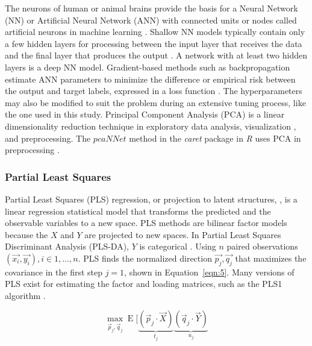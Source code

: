 \let\LaTeXcline\cline\documentclass[sn-mathphys-num]{sn-jnl}\let\cline\LaTeXcline
\begin{document}
The neurons of human or animal brains provide the basis for a Neural Network (NN) or Artificial Neural Network (ANN) with connected units or nodes called artificial neurons in machine learning \cite{brahme2014comprehensive}. Shallow NN models typically contain only a few hidden layers for processing between the input layer that receives the data and the final layer that produces the output \cite{olden2002illuminating}. A network with at least two hidden layers \cite{bishop2006pattern} is a deep NN model. Gradient-based methods such as backpropagation estimate ANN parameters \cite{vapnik2013nature} to minimize the difference or empirical risk between the output and target labels, expressed in a loss function \cite{goodfellow2016deep}. The hyperparameters may also be modified to suit the problem \cite{probst2019tunability} during an extensive tuning process, like the one used in this study. Principal Component Analysis (PCA) \cite{stewart2019introduction} is a linear dimensionality reduction technique in exploratory data analysis, visualization \cite{jolliffe2016principal}, and preprocessing. The $pcaNNet$ method in the \textit{caret} package in \textit{R} uses PCA in preprocessing \cite{Kuhn2007, kuhn2008building, kuhn2013applied}.

\subsubsection{Partial Least Squares}

Partial Least Squares (PLS) regression, or projection to latent structures, \cite{abdi2010partial}, is a linear regression statistical model that transforms the predicted and the observable variables to a new space. PLS methods are bilinear factor models because the $X$ and $Y$ are projected to new spaces. In Partial Least Squares Discriminant Analysis (PLS-DA), $Y$ is categorical \cite{saebo2008lpls}. Using $n$ paired observations $\left(\vec{x_{i}}, \vec{y_{i}}\right), i \in 1, \dots, n$. PLS finds the normalized direction $\vec{p_{j}}, \vec{q_{j}}$ that maximizes the covariance in the first step $j = 1$, shown in Equation~\ref{eqn:5}. Many versions of PLS exist for estimating the factor and loading matrices, such as the PLS1 algorithm \cite{GONZALEZ2023104876}.

\begin{equation}
	\max_{{\vec{p}}_{j},{\vec{q}}_{j}}\operatorname{E} [\underbrace{({\vec{p}}_{j}\cdot {\vec{X}})}_{t_{j}}\underbrace{({\vec{q}}_{j}\cdot {\vec{Y}})}_{u_{j}}
	\label{eqn:5}
\end{equation}
\end{document}
